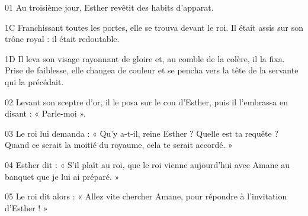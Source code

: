 01 Au troisième jour, Esther revêtit des habits d’apparat.

1C Franchissant toutes les portes, elle se trouva devant le roi. Il était assis sur son trône royal : il était redoutable.

1D Il leva son visage rayonnant de gloire et, au comble de la colère, il la fixa. Prise de faiblesse, elle changea de couleur et se pencha vers la tête de la servante qui la précédait.

02 Levant son sceptre d’or, il le posa sur le cou d’Esther, puis il l’embrassa en disant : « Parle-moi ».

03 Le roi lui demanda : « Qu’y a-t-il, reine Esther ? Quelle est ta requête ? Quand ce serait la moitié du royaume, cela te serait accordé. »

04 Esther dit : « S’il plaît au roi, que le roi vienne aujourd’hui avec Amane au banquet que je lui ai préparé. »

05 Le roi dit alors : « Allez vite chercher Amane, pour répondre à l’invitation d’Esther ! »